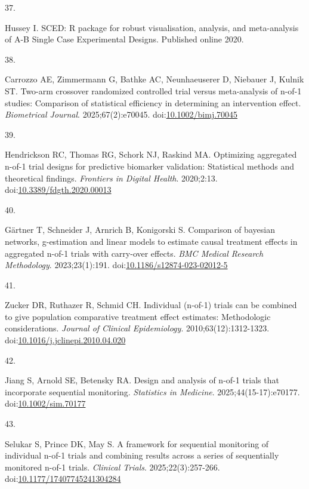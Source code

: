 \documentclass[
  11pt,
]{article}
\newlength{\cslhangindent}
\newlength{\csllabelwidth}
\newenvironment{CSLReferences}[2] %
 {\begin{list}{}{%
  \setlength{\itemindent}{0pt}
  \setlength{\leftmargin}{0pt}
  \setlength{\parsep}{0pt}
  \ifodd #1
   \setlength{\leftmargin}{\cslhangindent}
   \setlength{\itemindent}{-1\cslhangindent}
  \fi
  \setlength{\itemsep}{#2\baselineskip}}}
 {\end{list}}
\newcommand{\CSLLeftMargin}[1]{\parbox[t]{\csllabelwidth}{\strut#1\strut}}
\newcommand{\CSLRightInline}[1]{\parbox[t]{\linewidth - \csllabelwidth}{\strut#1\strut}}
\begin{document}
\begin{CSLReferences}{0}{1}
\CSLLeftMargin{37. }%
\CSLRightInline{Hussey I. {SCED}: {R} package for robust visualisation,
analysis, and meta-analysis of {A-B Single Case Experimental Designs}.
Published online 2020.}

\CSLLeftMargin{38. }%
\CSLRightInline{Carrozzo AE, Zimmermann G, Bathke AC, Neunhaeuserer D,
Niebauer J, Kulnik ST. Two-arm crossover randomized controlled trial
versus meta-analysis of n-of-1 studies: Comparison of statistical
efficiency in determining an intervention effect. \emph{Biometrical
Journal}. 2025;67(2):e70045.
doi:\href{https://doi.org/10.1002/bimj.70045}{10.1002/bimj.70045}}

\CSLLeftMargin{39. }%
\CSLRightInline{Hendrickson RC, Thomas RG, Schork NJ, Raskind MA.
Optimizing aggregated n-of-1 trial designs for predictive biomarker
validation: Statistical methods and theoretical findings.
\emph{Frontiers in Digital Health}. 2020;2:13.
doi:\href{https://doi.org/10.3389/fdgth.2020.00013}{10.3389/fdgth.2020.00013}}

\CSLLeftMargin{40. }%
\CSLRightInline{Gärtner T, Schneider J, Arnrich B, Konigorski S.
Comparison of bayesian networks, g-estimation and linear models to
estimate causal treatment effects in aggregated n-of-1 trials with
carry-over effects. \emph{BMC Medical Research Methodology}.
2023;23(1):191.
doi:\href{https://doi.org/10.1186/s12874-023-02012-5}{10.1186/s12874-023-02012-5}}

\CSLLeftMargin{41. }%
\CSLRightInline{Zucker DR, Ruthazer R, Schmid CH. Individual (n-of-1)
trials can be combined to give population comparative treatment effect
estimates: Methodologic considerations. \emph{Journal of Clinical
Epidemiology}. 2010;63(12):1312-1323.
doi:\href{https://doi.org/10.1016/j.jclinepi.2010.04.020}{10.1016/j.jclinepi.2010.04.020}}

\CSLLeftMargin{42. }%
\CSLRightInline{Jiang S, Arnold SE, Betensky RA. Design and analysis of
n-of-1 trials that incorporate sequential monitoring. \emph{Statistics
in Medicine}. 2025;44(15-17):e70177.
doi:\href{https://doi.org/10.1002/sim.70177}{10.1002/sim.70177}}

\CSLLeftMargin{43. }%
\CSLRightInline{Selukar S, Prince DK, May S. A framework for sequential
monitoring of individual n-of-1 trials and combining results across a
series of sequentially monitored n-of-1 trials. \emph{Clinical Trials}.
2025;22(3):257-266.
doi:\href{https://doi.org/10.1177/17407745241304284}{10.1177/17407745241304284}}


\end{CSLReferences}
\end{document}
